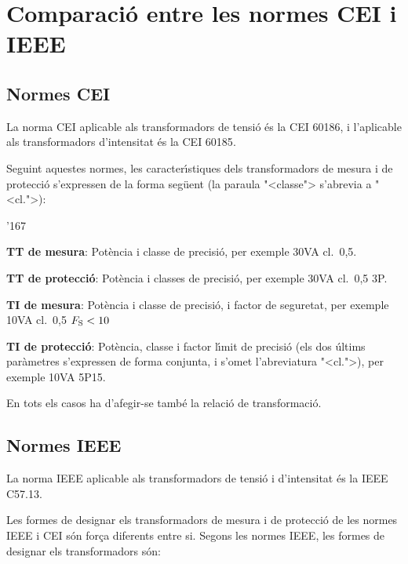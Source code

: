 \section{Comparaci\'{o} entre les normes CEI i
IEEE}\label{sec:comp_tt_ti_cei_ieee}

\subsection{Normes CEI}

La norma \textsf{CEI} aplicable als transformadors de tensi\'{o} \'{e}s la
\textsf{CEI 60186}, i l'aplicable als transformadors
d'intensitat \'{e}s la \textsf{CEI 60185}.

Seguint aquestes normes, les caracter\'{\i}stiques dels transformadors de
mesura i de protecci\'{o} s'expressen de la forma seg\"{u}ent (la paraula
{"<}classe{">} s'abrevia a {"<}cl.{">}):
\begin{dinglist}{'167}
   \item \textbf{TT de mesura}: Pot\`{e}ncia i classe de precisi\'{o}, per
   exemple 30\unit{VA} cl.~0,5.
   \item \textbf{TT de protecci\'{o}}: Pot\`{e}ncia i classes de precisi\'{o}, per
   exemple 30\unit{VA} cl.~0,5 3P.
   \item \textbf{TI de mesura}: Pot\`{e}ncia i classe de precisi\'{o}, i factor de seguretat, per
   exemple 10\unit{VA} cl.~0,5 $F_\mathrm{S}<10$
   \item \textbf{TI de protecci\'{o}}: Pot\`{e}ncia, classe i factor l\'{\i}mit de precisi\'{o}
    (els dos \'{u}ltims par\`{a}metres s'expressen de forma conjunta, i s'omet l'abreviatura {"<}cl.{">}),
     per exemple 10\unit{VA} 5P15.
\end{dinglist}

En tots els casos ha d'afegir-se tamb\'{e} la relaci\'{o} de transformaci\'{o}.

\subsection{Normes IEEE}

La norma \textsf{IEEE} aplicable als transformadors de tensi\'{o} i
d'intensitat \'{e}s la \textsf{IEEE C57.13}.

Les formes de designar els transformadors  de mesura i de protecci\'{o}
de les normes \textsf{IEEE} i \textsf{CEI} s\'{o}n for\c{c}a diferents
entre si. Segons les normes \textsf{IEEE},  les formes de designar
els transformadors s\'{o}n:

